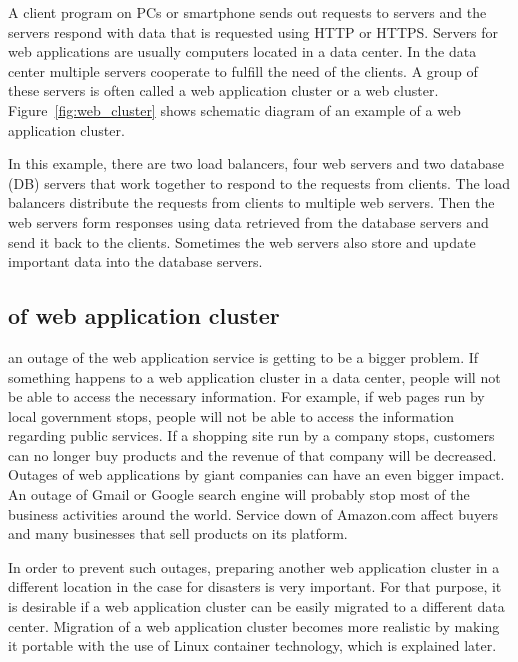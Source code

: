A client program on PCs or smartphone sends out requests to servers\added{,} and the servers respond with data that is requested using HTTP or HTTPS. 
Servers for web applications are usually computers located in a data center.
In the data center multiple servers cooperate to fulfill the need of the clients.
A group of these servers is often called a web application cluster or a web cluster.
Figure~\ref{fig:web_cluster} shows schematic diagram of an example of a web application cluster.

In this example, there are two load balancers, four web servers and two database (DB) servers that work together to respond to the requests from clients.
The load balancers distribute the requests from clients to multiple web servers.
Then the web servers form responses using data retrieved from the database servers and send it back to the clients.
Sometimes the web servers also store and update important data into the database servers.

\subsection{ of web application cluster}


  an outage of the web application service is getting to be a bigger problem.
If something happens to a web application cluster in a data center, people will not be able to access the necessary information.
%
For example, if web pages run by local government stops, people will not be able to access the information regarding public services.
If a shopping site run by a company stops, customers can no longer buy products and the revenue of that company will be decreased.
Outages of web applications by giant companies can have an even bigger impact.
An outage of Gmail or Google search engine will probably stop most of the business activities around the world.
Service down of Amazon.com affect buyers and many businesses that sell products on its platform.

In order to prevent such outages, preparing another web application cluster in a different location in the case for disasters is very important.
For that purpose, it is desirable if a web application cluster can be easily migrated to a different data center.
Migration of a web application cluster becomes more realistic by making it portable with the use of Linux container technology, which is explained later.

